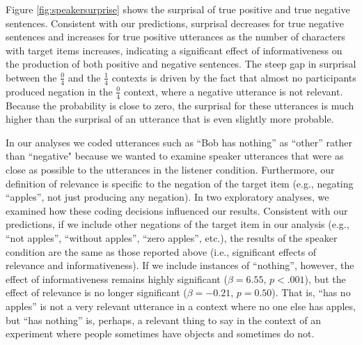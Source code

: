 \documentclass[man, noapacite]{apa2}
\begin{document}



Figure \ref{fig:speakersurprise} shows the surprisal of true positive and true negative sentences.  Consistent with our predictions, surprisal decreases for true negative sentences and increases for true positive utterances as the number of characters with target items increases, indicating a significant effect of informativeness on the production of both positive and negative sentences. The steep gap in surprisal between the $\frac{0}{4}$ and the $\frac{1}{4}$ contexts is driven by the fact that almost no participants produced negation in the $\frac{0}{4}$ context, where a negative utterance is not relevant. Because the probability is close to zero, the surprisal for these utterances is much higher than the surprisal of an utterance that is even slightly more probable. 

In our analyses we coded utterances such as ``Bob has nothing'' as ``other'' rather than ``negative" because we wanted to examine speaker utterances that were as close as possible to the utterances in the listener condition. Furthermore, our definition of relevance is specific to the negation of the target item (e.g., negating ``apples'', not just producing any negation). In two exploratory analyses, we examined how these coding decisions influenced our results. Consistent with our predictions, if we include other negations of the target item in our analysis (e.g., ``not apples'', ``without apples'', ``zero apples'', etc.), the results of the speaker condition are the same as those reported above (i.e., significant effects of relevance and informativeness). If we include instances of ``nothing'', however, the effect of informativeness remains highly significant ($\beta= 6.55$, $p< .001$), but the effect of relevance is no longer significant ($\beta= -0.21$, $p = 0.50$). That is, ``has no apples'' is not a very relevant utterance in a context where no one else has apples, but ``has nothing'' is, perhaps, a relevant thing to say in the context of an experiment where people sometimes have objects and sometimes do not. 
\end{document}
